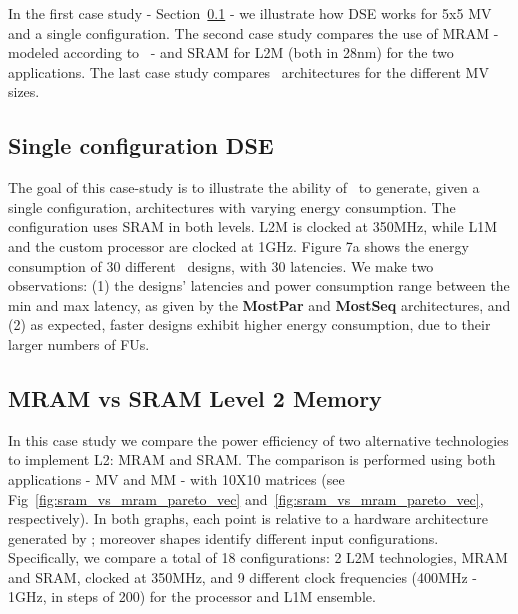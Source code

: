 In the first case study - Section~\ref{ssec:exp_single} - we illustrate how DSE works for 5x5 MV and a single configuration. The second case study compares the use of MRAM - modeled according to~\cite{8310393} - and SRAM for L2M (both in 28nm) for the two applications. The last case study compares \frameworkname~architectures for the different MV sizes.

\vspace{-1mm}
\subsection{Single configuration DSE}
\label{ssec:exp_single}
\vspace{-1mm}
The goal of this case-study is to illustrate the ability of \frameworkname~to generate, given a single configuration, architectures with varying energy consumption. The configuration uses SRAM in both levels. L2M is clocked at 350MHz, while L1M and the custom processor are clocked at 1GHz. Figure 7a shows the energy consumption of 30 different \frameworkname~designs, with 30 latencies. We make two observations: (1) the designs' latencies and power consumption range between the min and max latency, as given by the \textbf{MostPar} and \textbf{MostSeq} architectures, and (2) as expected, faster designs exhibit higher energy consumption, due to their larger numbers of FUs.


\vspace{-1mm}
\subsection{MRAM vs SRAM Level 2 Memory}
\label{ssec:case_study2}
\vspace{-1mm}

In this case study we compare the power efficiency of two alternative technologies to implement L2: MRAM and SRAM. 
The comparison is performed using both applications - MV and MM - with 10X10 matrices (see Fig~\ref{fig:sram_vs_mram_pareto_vec} and~\ref{fig:sram_vs_mram_pareto_vec}, respectively). In both graphs, each point is relative to a hardware architecture generated by \frameworkname; moreover shapes identify different input configurations. Specifically, we compare a total of 18 configurations: 2 L2M technologies, MRAM and SRAM, clocked at 350MHz, and 9 different clock frequencies (400MHz - 1GHz, in steps of 200) for the processor and L1M ensemble. 

